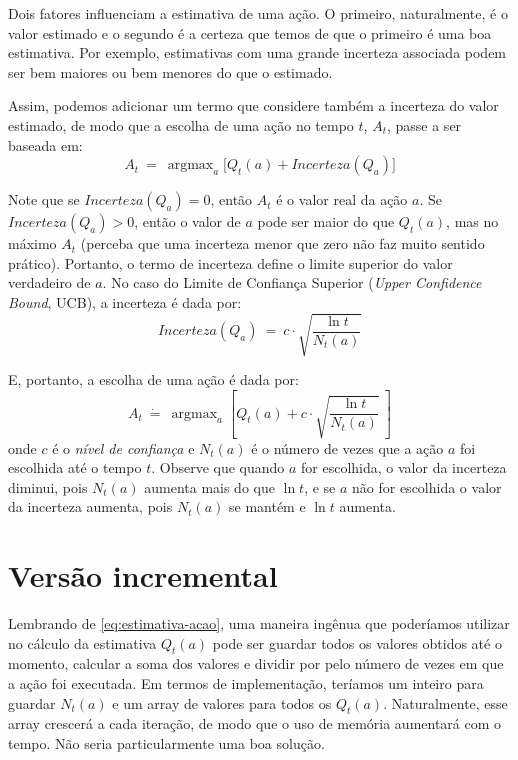 \documentclass{article}
\DeclareMathOperator*{\argmax}{argmax}
\begin{document}
            Dois fatores influenciam a estimativa de uma ação. O primeiro, naturalmente, é o valor estimado e o segundo é a certeza que temos de que o primeiro é uma boa estimativa. Por exemplo, estimativas com uma grande incerteza associada podem ser bem maiores ou bem menores do que o estimado.
            
            Assim, podemos adicionar um termo que considere também a incerteza do valor estimado, de modo que a escolha de uma ação no tempo $t$, $A_t$, passe a ser baseada em:            
            \begin{equation}
                A_t \ = \ \argmax_a \Big[ Q_t(a) + Incerteza(Q_a) \Big]
            \end{equation}           
            
            Note que se $Incerteza(Q_a) = 0$, então $A_t$ é o valor real da ação $a$. Se $Incerteza(Q_a) > 0$, então o valor de $a$ pode ser maior do que $Q_t(a)$, mas no máximo $A_t$ (perceba que uma incerteza menor que zero não faz muito sentido prático). Portanto, o termo de incerteza define o limite superior do valor verdadeiro de $a$. No caso do Limite de Confiança Superior (\emph{Upper Confidence Bound}, UCB), a incerteza é dada por:            
            \begin{equation}
                Incerteza(Q_a) \ = \ c \cdot \sqrt{\frac{\ln{t}}{N_t(a)}}
            \end{equation}
            
            E, portanto, a escolha de uma ação é dada por:            
            \begin{equation}
                A_t \ \dot{=} \ \argmax_a \left[ Q_t(a) + c \cdot \sqrt{\frac{\ln{t}}{N_t(a)}} \ \right]
            \end{equation}            
            \noindent
            onde $c$ é o \emph{nível de confiança} e $N_t(a)$ é o número de vezes que a ação $a$ foi escolhida até o tempo $t$. Observe que quando $a$ for escolhida, o valor da incerteza diminui, pois $N_t(a)$ aumenta mais do que $\ln{t}$, e se $a$ não for escolhida o valor da incerteza aumenta, pois $N_t(a)$ se mantém e $\ln{t}$ aumenta.
            
    \section{Versão incremental}

        Lembrando de \eqref{eq:estimativa-acao}, uma maneira ingênua que poderíamos utilizar no cálculo da estimativa $Q_t(a)$ pode ser guardar todos os valores obtidos até o momento, calcular a soma dos valores e dividir por pelo número de vezes em que a ação foi executada. Em termos de implementação, teríamos um inteiro para guardar $N_t(a)$ e um array de valores para todos os $Q_t(a)$. Naturalmente, esse array crescerá a cada iteração, de modo que o uso de memória aumentará com o tempo. Não seria particularmente uma boa solução.
        
\end{document}
